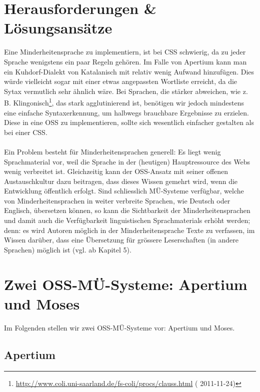 \documentclass[11pt,twoside]{mparticle}
\newcommand{\urld}[2][???]{\url{#2} (\iflanguage{ngerman}{letzter
    Zugriff:}{accessed} #1)}
\begin{document}
\section{Herausforderungen \& Lösungsansätze}
\label{herausforderungen}
Eine Minderheitensprache zu implementiern, ist bei CSS schwierig, da
zu jeder Sprache wenigstens ein paar Regeln gehören. Im Falle von
Apertium kann man ein Kuhdorf-Dialekt von Katalanisch mit relativ
wenig Aufwand hinzufügen. Dies würde vielleicht sogar mit einer etwas
angepassten Wortliste erreicht, da die Sytax vermutlich sehr
ähnlich wäre. Bei Sprachen, die stärker abweichen, wie z. B. Klingonisch\footnote{\urld[2011-11-24]{http://www.coli.uni-saarland.de/fs-coli/procs/clauss.html}},
das stark agglutinierend ist, benötigen wir jedoch mindestens eine einfache 
Syntaxerkennung, um halbwegs brauchbare Ergebnisse zu erzielen. Diese in eine OSS zu
implementieren, sollte sich wesentlich einfacher gestalten als bei
einer CSS.
\\
\\
Ein Problem besteht für Minderheitensprachen generell: Es liegt wenig Sprachmaterial vor, weil die Sprache
in der (heutigen) Hauptressource des Webs wenig verbreitet ist. Gleichzeitig kann der OSS-Ansatz mit seiner
offenen Austauschkultur dazu beitragen, dass dieses Wissen gemehrt wird, wenn die Entwicklung öffentlich
erfolgt. Sind schliesslich MÜ-Systeme verfügbar, welche von Minderheitensprachen in weiter verbreite
Sprachen, wie Deutsch oder Englisch, übersetzen können, so kann die Sichtbarkeit der Minderheitensprachen
und damit auch die Verfügbarkeit linguistischen Sprachmaterials erhöht werden; denn: es wird Autoren möglich in der
Minderheitensprache Texte zu verfassen, im Wissen darüber, dass eine Übersetzung für grössere Leserschaften (in
andere Sprachen) möglich ist (vgl. \cite{forcada} ab Kapitel 5).

\section{Zwei OSS-MÜ-Systeme: Apertium und Moses}
\label{apertiumMoses}
Im Folgenden stellen wir zwei OSS-MÜ-Systeme vor: Apertium und Moses.

\subsection{Apertium}
\label{apertium}
\end{document}
